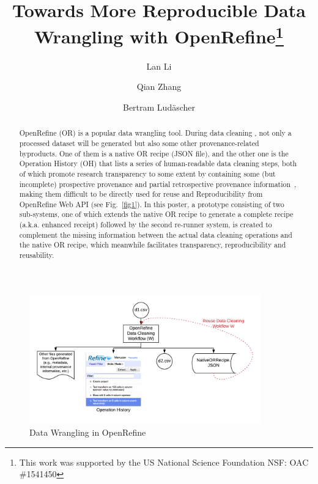 \documentclass[runningheads]{llncs}
\begin{document}
\newcommand{\ywa}[1]{\textsf{#1}}

%
\title{Towards More Reproducible Data Wrangling with OpenRefine\thanks{This work was supported by the US National Science Foundation NSF: OAC \#1541450}}
%
%
\author{Lan Li \and
Qian Zhang \and
Bertram Lud\"ascher}
%
%

\maketitle              %
%
\begin{abstract}
OpenRefine (OR) is a popular data wrangling tool. During data cleaning , not only a processed dataset will be generated but also some other provenance-related byproducts. One of them is a native OR recipe (JSON file), and the other one is the Operation History (OH) that lists a series of human-readable data cleaning steps, both of which promote research transparency to some extent by containing some (but incomplete) prospective provenance and partial retrospective provenance information~\cite{ref_proc1}, making them difficult to be directly used for reuse and Reproducibility from OpenRefine Web API (see Fig.~\ref{fig1}). In this poster, a prototype consisting of two sub-systems, one of which extends the native OR recipe to generate a complete recipe (a.k.a. enhanced receipt)  followed by the second re-runner system, is created to complement the missing information between the actual data cleaning operations and the native OR recipe, which meanwhile facilitates transparency, reproducibility and reusability. 

\end{abstract}

\begin{figure}
\centering
\includegraphics[width=100mm,scale=0.7]{figs/DC.png}
\caption{Data Wrangling in OpenRefine} \label{fig1}
\end{figure}
\end{document}
